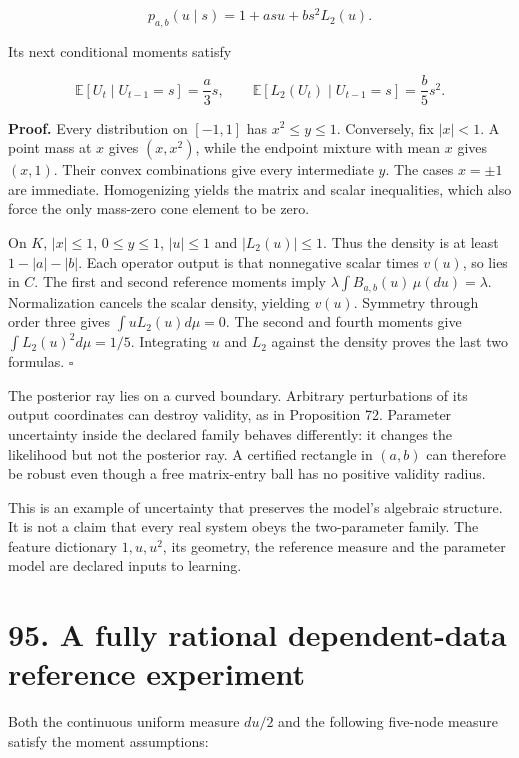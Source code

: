 \documentclass[11pt,letterpaper]{article}
\begin{document}
\[
p_{a,b}(u\mid s)=1+a s u+b s^2L_2(u).
\]

Its next conditional moments satisfy

\[
\boxed{
\mathbb E[U_t\mid U_{t-1}=s]=\frac a3s,
\qquad
\mathbb E[L_2(U_t)\mid U_{t-1}=s]=\frac b5s^2.
}
\]

\textbf{Proof.} Every distribution on \([-1,1]\) has \(x^2\leq y\leq1\).
Conversely, fix \(|x|<1\). A point mass at \(x\) gives \((x,x^2)\),
while the endpoint mixture with mean \(x\) gives \((x,1)\). Their convex
combinations give every intermediate \(y\). The cases \(x=\pm1\) are
immediate. Homogenizing yields the matrix and scalar inequalities, which
also force the only mass-zero cone element to be zero.

On \(K\), \(|x|\leq1\), \(0\leq y\leq1\), \(|u|\leq1\) and
\(|L_2(u)|\leq1\). Thus the density is at least \(1-|a|-|b|\). Each
operator output is that nonnegative scalar times \(v(u)\), so lies in
\(C\). The first and second reference moments imply
\(\lambda\int B_{a,b}(u)\,\mu(du)=\lambda\). Normalization cancels the
scalar density, yielding \(v(u)\). Symmetry through order three gives
\(\int uL_2(u)d\mu=0\). The second and fourth moments give
\(\int L_2(u)^2d\mu=1/5\). Integrating \(u\) and \(L_2\) against the
density proves the last two formulas. \(\square\)

The posterior ray lies on a curved boundary. Arbitrary perturbations of
its output coordinates can destroy validity, as in Proposition 72.
Parameter uncertainty inside the declared family behaves differently: it
changes the likelihood but not the posterior ray. A certified rectangle
in \((a,b)\) can therefore be robust even though a free matrix-entry
ball has no positive validity radius.

This is an example of uncertainty that preserves the model's algebraic
structure. It is not a claim that every real system obeys the
two-parameter family. The feature dictionary \(1,u,u^2\), its geometry,
the reference measure and the parameter model are declared inputs to
learning.

\section{95. A fully rational dependent-data reference
experiment}\label{a-fully-rational-dependent-data-reference-experiment}

Both the continuous uniform measure \(du/2\) and the following five-node
measure satisfy the moment assumptions:
\end{document}

